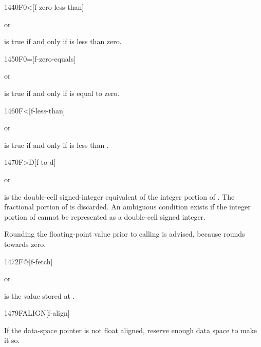 \begin{worddef}[F0less]{1440}{F0<}[f-zero-less-than]
\item {}  or

	 is true if and only if  is less than
	zero.
\end{worddef}


\begin{worddef}{1450}{F0=}[f-zero-equals]
\item {}  or

	 is true if and only if  is equal to
	zero.
\end{worddef}


\begin{worddef}[Fless]{1460}{F<}[f-less-than]
\item {}  or

	 is true if and only if  is less than
	.
\end{worddef}

\enlargethispage{6ex}
\begin{worddef}[FtoD]{1470}{F>D}[f-to-d]
\item {}  or

	 is the double-cell signed-integer equivalent of the
	integer portion of . The fractional portion of 
	is discarded. An ambiguous condition exists if the integer portion
	of  cannot be represented as a double-cell
	signed integer.

\note Rounding the floating-point value prior to calling 
	is advised, because  rounds towards zero.
\end{worddef}


\begin{worddef}{1472}{F@}[f-fetch]
\item {}  or

	 is the value stored at .
\end{worddef}


\begin{worddef}{1479}{FALIGN}[f-align]
\item \stack{}{}

	If the data-space pointer is not float aligned, reserve enough
	data space to make it so.
\end{worddef}


